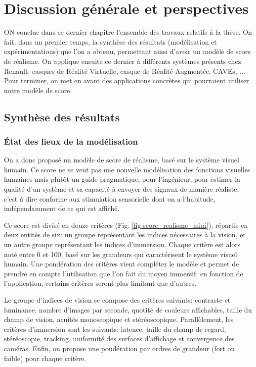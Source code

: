 \chapter*{Discussion générale et perspectives}

\lettrine[lines=3]{O}{N} conclue dans ce dernier chapitre l'ensemble des travaux relatifs à la thèse. On fait, dans un premier temps, la synthèse des résultats (modélisation et expérimentations) que l'on a obtenu, permettant ainsi d'avoir un modèle de score de réalisme. On applique ensuite ce dernier à différents systèmes présents chez Renault: casques de Réalité Virtuelle, casque de Réalité Augmentée, CAVEs, ... Pour terminer, on met en avant des applications concrètes qui pourraient utiliser notre modèle de score.

\section*{Synthèse des résultats}
	\subsection*{État des lieux de la modélisation}
	\par On a donc proposé un modèle de score de réalisme, basé sur le système visuel humain. Ce score ne se veut pas une nouvelle modélisation des fonctions visuelles humaines mais plutôt un guide pragmatique, pour l'ingénieur, pour estimer la qualité d'un système et sa capacité à envoyer des signaux de manière réaliste, c'est à dire conforme aux stimulation sensorielle dont on a l'habitude, indépendamment de ce qui est affiché.
	
	\par Ce score est divisé en douze critères (Fig. \ref{fig:score_realisme_mini}), répartis en deux entités de six: un groupe représentant les indices nécessaires à la vision, et un autre groupe représentant les indices d'immersion. Chaque critère est alors noté entre 0 et 100, basé sur les grandeurs qui caractérisent le système visuel humain. Une pondération des critères vient compléter le modèle et permet de prendre en compte l'utilisation que l'on fait du moyen immersif: en fonction de l'application, certains critères seront plus limitant que d'autres.
	
	\par Le groupe d'indices de vision se compose des critères suivants: contraste et luminance, nombre d'images par seconde, quotité de couleurs affichables, taille du champ de vision, acuités monoscopique et stéréoscopique. Parallèlement, les critères d'immersion sont les suivants: latence, taille du champ de regard, stéréoscopie, tracking, uniformité des surfaces d'affichage et convergence des caméras. Enfin, on propose une pondération par ordres de grandeur (fort ou faible) pour chaque critère.
	

